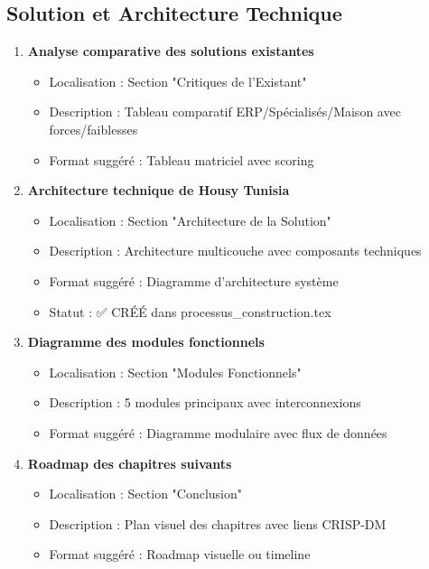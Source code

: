 \subsection{Solution et Architecture Technique}

\begin{enumerate}
    \item \textbf{Analyse comparative des solutions existantes}
    \begin{itemize}
        \item Localisation : Section "Critiques de l'Existant"
        \item Description : Tableau comparatif ERP/Spécialisés/Maison avec forces/faiblesses
        \item Format suggéré : Tableau matriciel avec scoring
    \end{itemize}
    
    \item \textbf{Architecture technique de Housy Tunisia}
    \begin{itemize}
        \item Localisation : Section "Architecture de la Solution"
        \item Description : Architecture multicouche avec composants techniques
        \item Format suggéré : Diagramme d'architecture système
        \item Statut : ✅ CRÉÉ dans processus\_construction.tex
    \end{itemize}
    
    \item \textbf{Diagramme des modules fonctionnels}
    \begin{itemize}
        \item Localisation : Section "Modules Fonctionnels"
        \item Description : 5 modules principaux avec interconnexions
        \item Format suggéré : Diagramme modulaire avec flux de données
    \end{itemize}
    
    \item \textbf{Roadmap des chapitres suivants}
    \begin{itemize}
        \item Localisation : Section "Conclusion"
        \item Description : Plan visuel des chapitres avec liens CRISP-DM
        \item Format suggéré : Roadmap visuelle ou timeline
    \end{itemize}
\end{enumerate}

